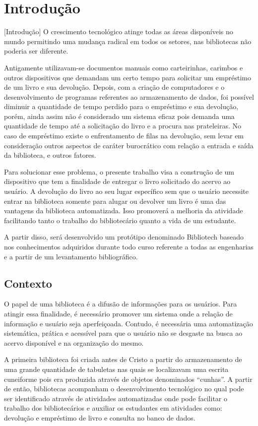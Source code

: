 \chapter{Introdução}[Introdução]
O crescimento tecnológico atinge todas as áreas disponíveis no mundo permitindo uma mudança radical em todos os setores, nas bibliotecas não poderia ser diferente.

Antigamente utilizavam-se documentos manuais como carteirinhas, carimbos e outros dispositivos que demandam um certo tempo para solicitar um empréstimo de um livro e sua devolução. Depois, com a criação de computadores e o desenvolvimento de programas referentes ao armazenamento de dados, foi possível diminuir a quantidade de tempo perdido para o empréstimo e sua devolução, porém, ainda assim não é considerado um sistema eficaz pois demanda uma quantidade de tempo até a solicitação do livro e a procura nas prateleiras. No caso de empréstimo existe o enfrentamento de filas na devolução, sem levar em consideração outros aspectos de caráter burocrático com relação a entrada e saída da biblioteca, e outros fatores.

Para solucionar esse problema, o presente trabalho visa a construção de um dispositivo que tem a finalidade de entregar o livro solicitado do acervo ao usuário. A devolução do livro ao seu lugar específico sem que o usuário necessite entrar na biblioteca somente para alugar ou devolver um livro é uma das vantagens da biblioteca automatizada. Isso promoverá a melhoria da atividade facilitando tanto o trabalho do bibliotecário quanto a vida de um estudante.

A partir disso, será desenvolvido um protótipo denominado Bibliotech baseado nos conhecimentos adquiridos durante todo curso referente a todas as engenharias e a partir de um levantamento bibliográfico.

\section{Contexto}

O papel de uma biblioteca é a difusão de informações para os usuários. Para atingir essa finalidade, é necessário promover um sistema onde a relação de informação e usuário seja aperfeiçoada. Contudo, é necessária uma automatização sistemática, prática e acessível para que o usuário não se desgaste na busca ao acervo disponível e na organização do mesmo. 

A primeira biblioteca foi criada antes de Cristo a partir do armazenamento de uma grande quantidade de tabuletas nas quais se localizavam uma escrita cuneiforme pois era produzida através de objetos denominados “cunhas”. A partir de então, bibliotecas acompanham o desenvolvimento tecnológico no qual pode ser identificado através de atividades automatizadas onde pode facilitar o trabalho dos bibliotecários e auxiliar os estudantes em atividades como: devolução e empréstimo de livro e consulta no banco de dados.

